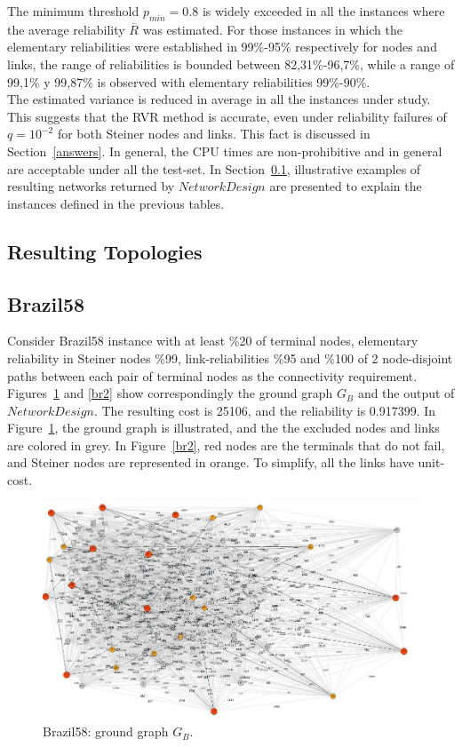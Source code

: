 The minimum threshold $p_{min}=0.8$ is widely exceeded in all the instances where the 
average reliability $\overline{R}$ was estimated. For those instances in which the 
elementary reliabilities were established in 99\%-95\% respectively for nodes and links, 
the range of reliabilities is bounded between 82,31\%-96,7\%, while a range of 
99,1\% y 99,87\% is observed with elementary reliabilities 99\%-90\%.\\


The estimated variance is reduced in average in all the instances under study. This suggests that 
the RVR method is accurate, even under reliability failures of $q=10^{-2}$ for both Steiner nodes and links. This fact is discussed in Section~\ref{answers}. In general, the CPU times are non-prohibitive and in general are acceptable under all the test-set. In Section~\ref{topologies}, illustrative examples of resulting networks returned by $NetworkDesign$ are presented to explain the instances defined in the previous tables.

\subsection{Resulting Topologies}\label{topologies}
\subsection*{Brazil58}
Consider Brazil58 instance with at least \%20 of terminal nodes, elementary reliability in 
Steiner nodes \%99, link-reliabilities \%95 and \%100 of 2 node-disjoint paths between each pair 
of terminal nodes as the connectivity requirement. Figures~\ref{br1} and \ref{br2} show correspondingly 
the ground graph $G_B$ and the output of $NetworkDesign$. The resulting cost is 25106, and the 
reliability is 0.917399. In Figure~\ref{br1}, the ground graph is illustrated, and the the excluded nodes and links are colored in grey. In Figure~\ref{br2}, red nodes are the terminals that do not fail, and 
Steiner nodes are represented in orange. To simplify, all the links have unit-cost.  


\begin{figure}
\begin{center}
\includegraphics[scale=0.55]{1.jpg}
\caption{Brazil58: ground graph $G_B$.}\label{br1}
\end{center} 
\end{figure}

